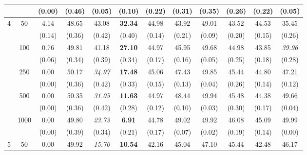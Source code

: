 \documentclass[twoside]{article}
\newcommand{\0}{\mathbf{0}}
\newcommand{\1}{\mathbf{1}}
\numberwithin{equation}{section}
\begin{document}
\begin{table}[t]
\begin{tabular}{|c|c|c|c|c|c|c|c|c|c|c|c|}
    &  & (0.00)    & (0.46)                   & (0.05)                   & (0.10)                    & (0.22) & (0.31) & (0.35) & (0.26) & (0.22) & (0.05) \\ \hline
\multirow{10}{*}{4}    & \multirow{2}{*}{50}   & 4.14   & 48.65                    & 43.08                    & {\bf 32.34}                    & 44.98  & 43.92  & 49.01  & 43.52  & 44.53  & 35.45  \\
    &  & (0.14) & (0.36)                   & (0.42)                   & (0.40)                    & (0.14) & (0.21) & (0.09) & (0.20)  & (0.15) & (0.26) \\ \cline{2-12}
    & \multirow{2}{*}{100}  & 0.76   & 49.81                    & 41.18                    & {\bf 27.10}                     & 44.97  & 45.95  & 49.68  & 44.98  & 43.85  & {\it 39.96}  \\
    &  & (0.06) & (0.34)                   & (0.39)                   & (0.34)                   & (0.17) & (0.16) & (0.05) & (0.25) & (0.18) & (0.28) \\ \cline{2-12}
    & \multirow{2}{*}{250}  & 0.00      & 50.17                    & {\it 34.97}                    & {\bf 17.48}                    & 45.06  & 47.43  & 49.85  & 45.44  & 44.80   & 47.21  \\
    &  & (0.00)    & (0.36)                   & (0.42)                   & (0.33)                   & (0.15) & (0.13) & (0.04) & (0.26) & (0.14) & (0.12) \\ \cline{2-12}
    & \multirow{2}{*}{500}  & 0.00      & 50.35                    & {\it 31.05}                    & {\bf 11.63}                    & 44.97  & 48.44  & 49.94  & 45.48  & 44.38  & 49.66  \\
    &  & (0.00)    & (0.36)                   & (0.42)                   & (0.28)                   & (0.12) & (0.10)  & (0.03) & (0.30)  & (0.17) & (0.04) \\ \cline{2-12}
    & \multirow{2}{*}{1000} & 0.00      & 49.80                     & {\it 23.73}                    & {\bf 6.91}                     & 44.78  & 49.02  & 49.92  & 46.08  & 45.09  & 49.99  \\
    &  & (0.00)    & (0.39)                   & (0.34)                   & (0.21)                   & (0.17) & (0.07) & (0.02) & (0.19) & (0.14) & (0.00)    \\ \hline
\multirow{10}{*}{5}    & \multirow{2}{*}{50}   & 0.00     & 49.92                    & {\it 15.70}                     & {\bf 10.54}                    & 42.16  & 45.04  & 47.10   & 45.44  & 42.48  & 46.17  \\

\end{tabular}
\end{table}
\end{document}
